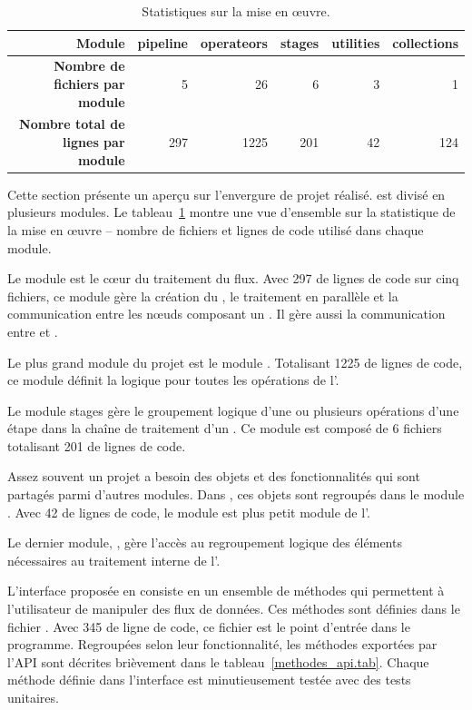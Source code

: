 \begin{center}
\footnotesize
\begin{longtable}{|r|r|r|r|r|r|}
\caption{Statistiques sur la mise en \oe uvre.\label{statistiquesPpFf.tab}}\\
\hline
\textbf{Module} & \textbf{pipeline} & \textbf{operateors} & \textbf{stages} & \textbf{utilities} & \textbf{collections}\\
\hline
\endhead
\hline
	\textbf{Nombre de fichiers par module} &	
	5 &
	26 &
	6 &
	3 &
	1
    \\
\hline
	\textbf{Nombre total de lignes par module} &
	297 &
	1225 &
	201 &
	42 &
	124
    \\                 
\hline    
\end{longtable}
\normalsize
\end{center} 

Cette section pr\'esente un aper\c {c}u sur l'envergure de projet r\'ealis\'e.  est divis\'e en plusieurs modules. Le tableau~\ref{statistiquesPpFf.tab} montre une vue d'ensemble sur la statistique de la mise en \oe uvre – nombre de fichiers et lignes de code utilis\'e dans chaque module. 

Le module  est le c\oe ur du traitement du flux. Avec 297 de lignes de code sur cinq fichiers, ce module g\`ere la cr\'eation du , le traitement en parall\`ele et la communication entre les n\oe uds composant un . Il g\`ere aussi la communication entre  et .

Le plus grand module du projet est le module . Totalisant 1225 de lignes de code, ce module d\'efinit la logique pour toutes les op\'erations de l'. 

Le module stages g\`ere le groupement logique d'une ou plusieurs op\'erations d'une \'etape dans la cha\^ine de traitement d'un . Ce module est compos\'e de 6 fichiers totalisant 201 de lignes de code. 

Assez souvent un projet a besoin des objets et des fonctionnalit\'es qui sont partag\'es parmi d'autres modules. Dans , ces objets sont regroup\'es dans le module . Avec 42 de lignes de code, le module  est plus petit module de l'.

Le dernier module, , g\`ere l'acc\`es au regroupement logique des \'el\'ements n\'ecessaires au traitement interne de l'. 

L'interface propos\'ee en  consiste en un ensemble de m\'ethodes qui permettent \`a l'utilisateur de manipuler des flux de donn\'ees. Ces m\'ethodes sont d\'efinies dans le fichier .  Avec 345 de ligne de code, ce fichier est le point d'entr\'ee dans le programme. Regroup\'ees selon leur fonctionnalit\'e, les m\'ethodes export\'ees par l'API sont d\'ecrites bri\`evement dans le tableau~\ref{methodes_api.tab}. Chaque m\'ethode d\'efinie dans l'interface est minutieusement test\'ee avec des tests unitaires. 



